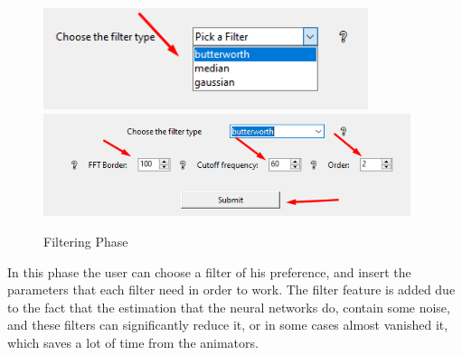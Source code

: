 \pagebreak

\begin{figure}[htp]
	\centering
	{\includegraphics[height=3cm,width=0.48\linewidth]{figures/Requirements/Workflow3_1.png}}
	\hspace{1em}%
	{\includegraphics[height=3cm, width=0.48\linewidth]{figures/Requirements/Workflow3_2.png}}
	\captionsetup{labelformat=empty}
	\caption{Filtering Phase}
\end{figure}

In this phase the user can choose a filter of his preference, and insert the parameters that each filter need in order to work. The filter feature is added due to the fact that the estimation that the neural networks do, contain some noise, and these filters can significantly reduce it, or in some cases almost vanished it, which saves a lot of time from the animators.